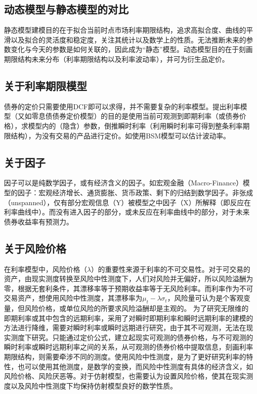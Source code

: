 \documentclass[11pt]{article}
\begin{document}
\subsection{动态模型与静态模型的对比}

静态模型建模目的在于拟合当前时点市场利率期限结构，追求高拟合度、曲线的平滑以及拟合的灵活度和稳定度，关注其统计以及数学上的性质。无法推断未来的参数变化与今天的参数是如何关联的，因此成为“静态”模型。动态模型目的在于刻画期限结构未来分布（利率期限结构以及利率波动率），并可为衍生品定价。 

\subsection{关于利率期限模型}

债券的定价只需要使用DCF即可以求得，并不需要复杂的利率模型。提出利率模型（又如零息债债券定价模型）的目的是使用当前可观测到即期利率（或债券价格），求模型内的（隐含）参数，倒推瞬时利率（利用瞬时利率可得到整条利率期限结构），为没有交易的产品进行定价。如使用BSM模型可以估计波动率。

\subsection{关于因子}

因子可以是纯数学因子，或有经济含义的因子。如宏观金融（Macro-Finance）模型的因子：宏观经济增长、通货膨胀、货币政策、剩下的归结到数学因子。非张成（unspanned），仅有部分宏观信息（Y）被模型之中因子（X）所解释（即反应在利率曲线中）。而没有进入因子的部分，或未反应在利率曲线中的部分，对于未来债券收益率有预测力。

\subsection{关于风险价格}

在利率模型中，风险价格（$\lambda$）的重要性来源于利率的不可交易性。对于可交易的资产，由现实测度转换至风险中性测度下，人们对风险并无偏好，所以风险溢酬为零，根据无套利条件，其漂移率等于预期收益率等于无风险利率。而利率作为不可交易资产，想使用风险中性测度，其漂移率为$\mu_t-\lambda\sigma_t$，风险量可认为是个客观变量，但风险价格，或单位风险的所要求风险溢酬却是主观的。
为了研究无限维的即期利率或其中包含的远期利率，采用了对瞬时即期利率和瞬时远期利率的建模的方法进行降维，需要对瞬时利率或瞬时远期进行研究，由于其不可观测，无法在现实测度下研究。只能通过定价公式，建立起现实可观测的债券价格，与不可观测的瞬时利率或瞬时远期利率之间的关系，从可观测的债券价格中提取信息，刻画利率期限结构，则需要牵涉不同的测度。使用风险中性测度，是为了更好研究利率的特性，也可以使用其他测度，是数学的变换，而风险中性测度有具体的经济含义，如风险价格、风险厌恶等。对于仿射模型，也需要认为设置风险价格，使其在现实测度以及风险中性测度下均保持仿射模型良好的数学性质。
\end{document}

